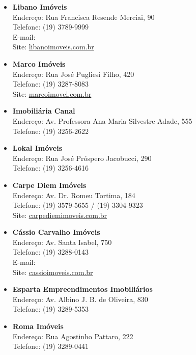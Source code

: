 \begin{itemize}
\item   \textbf{Libano Imóveis}
		\\Endereço: Rua Francisca Resende Merciai, 90
		\\Telefone: (19) 3789-9999
		\\E-mail: 
		\\Site: \url{libanoimoveis.com.br}

\item   \textbf{Marco Imóveis}
		\\Endereço: Rua José Pugliesi Filho, 420
		\\Telefone: (19) 3287-8083
		\\Site: \url{marcoimovel.com.br}

\item   \textbf{Imobiliária Canal}
		\\Endereço: Av. Professora Ana Maria Silvestre Adade, 555
		\\Telefone: (19) 3256-2622

\item   \textbf{Lokal Imóveis}
		\\Endereço: Rua José Próspero Jacobucci, 290
		\\Telefone: (19) 3256-4616

\item   \textbf{Carpe Diem Imóveis}
		\\Endereço: Av. Dr. Romeu Tortima, 184
		\\Telefone: (19) 3579-5655 / (19) 3304-9323
		\\Site: \url{carpediemimoveis.com.br}

\item   \textbf{Cássio Carvalho Imóveis}
		\\Endereço: Av. Santa Isabel, 750
		\\Telefone: (19) 3288-0143
		\\E-mail: 
		\\Site: \url{cassioimoveis.com.br}


\item   \textbf{Esparta Empreendimentos Imobiliários}
        \\Endereço: Av. Albino J. B. de Oliveira, 830
        \\Telefone: (19) 3289-5353

\item   \textbf{Roma Imóveis}
        \\Endereço: Rua Agostinho Pattaro, 222
        \\Telefone: (19) 3289-0441


\end{itemize}
